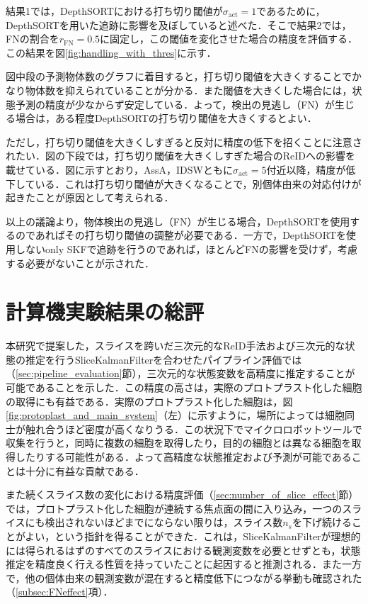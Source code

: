         結果1では，DepthSORTにおける打ち切り閾値が$\sigma_{\text{act}} = 1$であるために，DepthSORTを用いた追跡に影響を及ぼしていると述べた．そこで結果2では，FNの割合を$r_{\text{FN}} = 0.5$に固定し，この閾値を変化させた場合の精度を評価する．この結果を図\ref{fig:handling_with_thres}に示す．

        図中段の予測物体数のグラフに着目すると，打ち切り閾値を大きくすることでかなり物体数を抑えられていることが分かる．また閾値を大きくした場合には，状態予測の精度が少なからず安定している．よって，検出の見逃し（FN）が生じる場合は，ある程度DepthSORTの打ち切り閾値を大きくするとよい．

        ただし，打ち切り閾値を大きくしすぎると反対に精度の低下を招くことに注意されたい．図の下段では，打ち切り閾値を大きくしすぎた場合のReIDへの影響を載せている．図に示すとおり，AssA，IDSWともに$\sigma_{\text{act}} = 5$付近以降，精度が低下している．これは打ち切り閾値が大きくなることで，別個体由来の対応付けが起きたことが原因として考えられる．

        以上の議論より，物体検出の見逃し（FN）が生じる場合，DepthSORTを使用するのであればその打ち切り閾値の調整が必要である．一方で，DepthSORTを使用しないonly SKFで追跡を行うのであれば，ほとんどFNの影響を受けず，考慮する必要がないことが示された．

\section{計算機実験結果の総評}
\label{sec:general_review}

    本研究で提案した，スライスを跨いだ三次元的なReID手法および三次元的な状態の推定を行うSliceKalmanFilterを合わせたパイプライン評価では（\ref{sec:pipeline_evaluation}節），三次元的な状態変数を高精度に推定することが可能であることを示した．この精度の高さは，実際のプロトプラスト化した細胞の取得にも有益である．実際のプロトプラスト化した細胞は，図\ref{fig:protoplast_and_main_system}（左）に示すように，場所によっては細胞同士が触れ合うほど密度が高くなりうる．この状況下でマイクロロボットツールで収集を行うと，同時に複数の細胞を取得したり，目的の細胞とは異なる細胞を取得したりする可能性がある．よって高精度な状態推定および予測が可能であることは十分に有益な貢献である．

    また続くスライス数の変化における精度評価（\ref{sec:number_of_slice_effect}節）では，プロトプラスト化した細胞が連続する焦点面の間に入り込み，一つのスライスにも検出されないほどまでにならない限りは，スライス数$n_s$を下げ続けることがよい，という指針を得ることができた．これは，SliceKalmanFilterが理想的には得られるはずのすべてのスライスにおける観測変数を必要とせずとも，状態推定を精度良く行える性質を持っていたことに起因すると推測される．また一方で，他の個体由来の観測変数が混在すると精度低下につながる挙動も確認された（\ref{subsec:FNeffect}項）．

